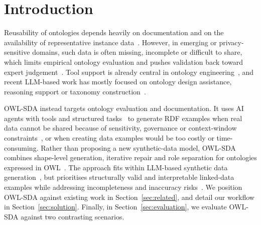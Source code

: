 \section{Introduction}
Reusability of ontologies depends heavily on documentation and on the availability of representative instance data~\cite{alharbi2021assessing}. However, in emerging or privacy-sensitive domains, such data is often missing, incomplete or difficult to share, which limits empirical ontology evaluation and pushes validation back toward expert judgement~\cite{brank2005survey}. Tool support is already central in ontology engineering~\cite{10.3233/SW-190382}, and recent LLM-based work has mostly focused on ontology design assistance, reasoning support or taxonomy construction~\cite{damiano2025evaluating,yang2026large,soares2025exploring}.

OWL-SDA instead targets ontology evaluation and documentation. It uses AI agents with tools and structured tasks~\cite{yehudai2025survey,10.1145/3491101.3519665,WEBBER1995253} to generate RDF examples when real data cannot be shared because of sensitivity, governance or context-window constraints~\cite{YAN2025100300,wang2024corag,vallevik2025processing,Kaabachi2025,Naik_2023}, or when creating data examples would be too costly or time-consuming. Rather than proposing a new synthetic-data model, OWL-SDA combines shape-level generation, iterative repair and role separation for ontologies expressed in OWL~\cite{Antoniou2009}. The approach fits within LLM-based synthetic data generation~\cite{electronics13173509}, but prioritises structurally valid and interpretable linked-data examples while addressing incompleteness and inaccuracy risks~\cite{hao2024synthetic}.  We position OWL-SDA against existing work in Section~\ref{sec:related}, and detail our workflow in Section~\ref{sec:solution}. Finally, in Section~\ref{sec:evaluation}, we evaluate OWL-SDA against two contrasting scenarios.